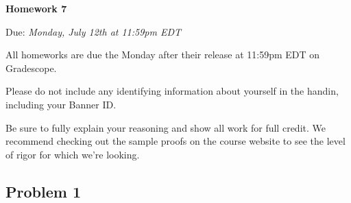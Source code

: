 \documentclass[12pt,letterpaper]{article}
\begin{document}
  \thispagestyle{firstpagestyle}
  \begin{center}
    {\huge \textbf{Homework 7}}

    {\large Due: \textit{Monday, July 12th at 11:59pm EDT}}
  \end{center}


    All homeworks are due the Monday after their release at 11:59pm EDT on Gradescope.

    Please do not include any identifying information about yourself in the handin, including your Banner ID.

    Be sure to fully explain your reasoning and show all work for full credit. We recommend checking out the sample proofs on the course website to see the level of rigor for which we're looking.
   
   
\subsection*{Problem 1}
\end{document}
